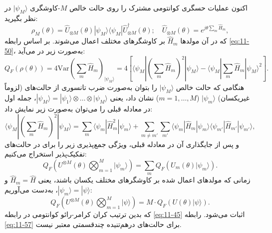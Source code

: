 اکنون عملیات حسگری کوانتومی مشترک را روی حالت خالص $M$-کاوشگری $|\psi_M\rangle$ در نظر بگیرید:
\begin{equation}
	\rho_M(\theta) = \hat{U}_{\otimes M}(\theta) |\psi_M\rangle \langle \psi_M | \hat{U}_{\otimes M}^\dagger(\theta); \quad \hat{U}_{\otimes M}(\theta) = e^{j\theta \sum_m \hat{H}_m},
	\label{eq:11-54}
\end{equation}
که در آن مولدها $\hat{H}_m$ بر کاوشگرهای مختلف اعمال می‌شوند. بر اساس رابطه \eqref{eq:11-50}،  به‌صورت زیر در می‌آید:
\begin{equation}
	Q_F(\rho(\theta)) = 4\text{Var} \left( \sum_m \hat{H}_m \right)_{|\psi_M\rangle} = 4 \left[ \langle \psi_M | \left( \sum_m \hat{H}_m \right)^2 |\psi_M\rangle - \langle \psi_M | \sum_m \hat{H}_m |\psi_M\rangle^2 \right].
	\label{eq:11-55}
\end{equation}
هنگامی که حالت خالص $|\psi_M\rangle$ را بتوان به‌صورت ضرب تانسوری از حالت‌های (لزوماً غیریکسان) $|\psi_m\rangle$ ($m=1, \dots, M$) نشان داد، یعنی $|\psi_M\rangle = |\psi_1\rangle \otimes \dots \otimes |\psi_M\rangle$، جمله اول در معادله قبلی را می‌توان به‌صورت زیر نمایش داد:
\begin{equation}
	\langle \psi_M | \left( \sum_m \hat{H}_m \right)^2 |\psi_M\rangle = \sum_m \langle \psi_m | \hat{H}_m^2 |\psi_m\rangle + \sum_{m \neq m'} \sum_{m'} \langle \psi_m | \hat{H}_m |\psi_m\rangle \langle \psi_{m'} | \hat{H}_{m'} |\psi_{m'}\rangle,
	\label{eq:11-56}
\end{equation}
و پس از جایگذاری آن در معادله قبلی، ویژگی جمع‌پذیری زیر را برای  در حالت‌های تفکیک‌پذیر استخراج می‌کنیم:
\begin{equation}
	Q_F \left( U^{\otimes M}(\theta) \bigotimes_{m=1}^{M} |\psi_m\rangle \right) = \sum_m Q_F(U_m(\theta) |\psi_m\rangle).
	\label{eq:11-57}
\end{equation}
زمانی که مولدهای اعمال شده بر کاوشگرهای مختلف یکسان باشند، یعنی $\hat{H}_m = \hat{H}$ و $|\psi_m\rangle = |\psi\rangle$، به‌دست می‌آوریم:
\begin{equation}
	Q_F (U^{\otimes M}(\theta) \bigotimes_{m=1}^{M} |\psi\rangle) = M \cdot Q_F(U(\theta) |\psi\rangle).
	\label{eq:11-58}
\end{equation}
که بدین ترتیب کران کرامر-رائو کوانتومی در رابطه \eqref{eq:11-45} اثبات می‌شود. رابطه \eqref{eq:11-57} برای حالت‌های درهم‌تنیده چندقسمتی معتبر نیست.

